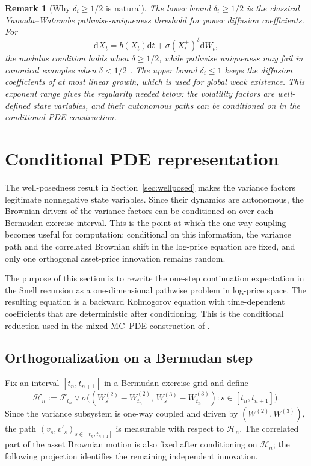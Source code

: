 \documentclass[pdflatex,sn-mathphys-num]{sn-jnl}
\theoremstyle{thmstyleone}%
\theoremstyle{thmstylethree}%
\theoremstyle{thmstyletwo}%
\newtheorem{remark}[theorem]{Remark}
\newcommand{\dd}{\mathrm d}
\begin{document}
\begin{remark}[Why $\delta_i\ge 1/2$ is natural]\label{rem:delta-half}
The lower bound $\delta_i\ge1/2$ is the classical Yamada--Watanabe pathwise-uniqueness threshold for power diffusion coefficients. For
\[
\dd X_t=b(X_t)\dd t+\sigma (X_t^+)^\delta \dd W_t,
\]
the modulus condition holds when $\delta\ge1/2$, while pathwise uniqueness may fail in canonical examples when $\delta<1/2$ \citep{yamada1971uniqueness}. The upper bound $\delta_i\le1$ keeps the diffusion coefficients of at most linear growth, which is used for global weak existence. This exponent range gives the regularity needed below: the volatility factors are well-defined state variables, and their autonomous paths can be conditioned on in the conditional PDE construction.
\end{remark}

\section{Conditional PDE representation}\label{sec:conditional_pde}
The well-posedness result in Section~\ref{sec:wellposed} makes the variance factors legitimate nonnegative
state variables. Since their dynamics are autonomous, the Brownian drivers of the variance factors can be
conditioned on over each Bermudan exercise interval. This is the point at which the one-way coupling becomes
useful for computation: conditional on this information, the variance path and the correlated Brownian shift in
the log-price equation are fixed, and only one orthogonal asset-price innovation remains random.

The purpose of this section is to rewrite the one-step continuation expectation in the Snell recursion as a
one-dimensional pathwise problem in log-price space. The resulting equation is a backward Kolmogorov equation
with time-dependent coefficients that are deterministic after conditioning. This is the conditional reduction
used in the mixed MC--PDE construction of \cite{farahany2020mixing}.

\subsection{Orthogonalization on a Bermudan step}

Fix an interval $[t_n,t_{n+1}]$ in a Bermudan exercise grid and define
\[
\mathcal H_n :=
\mathcal F_{t_n}\vee
\sigma\bigl((W^{(2)}_s-W^{(2)}_{t_n},\,W^{(3)}_s-W^{(3)}_{t_n}):s\in[t_n,t_{n+1}]\bigr).
\]
Since the variance subsystem is one-way coupled and driven by $(W^{(2)},W^{(3)})$, the path
$(v_s,v'_s)_{s\in[t_n,t_{n+1}]}$ is measurable with respect to $\mathcal H_n$.
The correlated part of the asset Brownian motion is also fixed after conditioning on $\mathcal H_n$; the
following projection identifies the remaining independent innovation.
\end{document}
